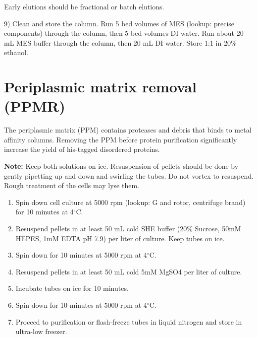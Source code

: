\begin{enumerate}
Early elutions should be fractional or batch elutions.

9) Clean and store the column. Run 5 bed volumes of MES (lookup: precise components) through the column, then 5 bed volumes DI water. 
Run about 20 mL MES buffer through the column, then 20 mL DI water.  Store 1:1 in 20\% ethanol.

\end{enumerate}

\section{Periplasmic matrix removal (PPMR)}
\label{sec:ppmr}

The periplasmic matrix (PPM) contains proteases and debris that binds to metal affinity columns.  Removing the PPM before protein purification significantly increase the yield of his-tagged disordered proteins.

\textbf{Note:} Keep both solutions on ice.  Resuspension of pellets should be done by gently pipetting up and down and swirling the tubes.  Do not vortex to resuspend.  Rough treatment of the cells may lyse them.

\begin{enumerate}

\item Spin down cell culture at 5000 rpm (lookup: G and rotor, centrifuge brand) for 10 minutes at 4$^\circ$C.

\item Resuspend pellets in at least 50 mL cold SHE buffer (20\% Sucrose, 50mM HEPES, 1mM EDTA pH 7.9) per liter of culture.  Keep tubes on ice.

\item Spin down for 10 minutes at 5000 rpm at 4$^\circ$C.

\item Resuspend pellets in at least 50 mL cold 5mM MgSO4 per liter of culture.

\item Incubate tubes on ice for 10 minutes.

\item Spin down for 10 minutes at 5000 rpm at 4$^\circ$C.

\item Proceed to purification or flash-freeze tubes in liquid nitrogen and store in ultra-low freezer.
\end{enumerate}


